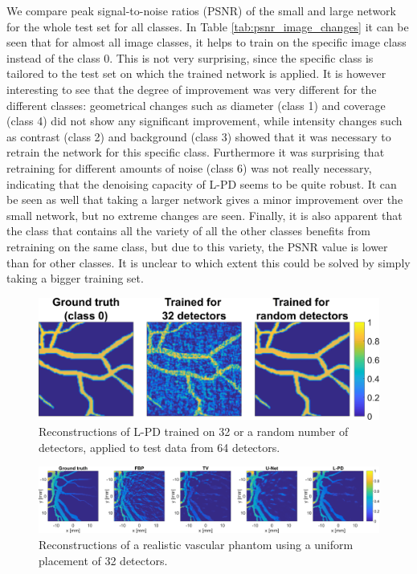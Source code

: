 \documentclass[journal]{IEEEtran}
\begin{document}
We compare peak signal-to-noise ratios (PSNR) of the small and large network for the whole test set for all classes. In Table \ref{tab:psnr_image_changes} it can be seen that for almost all image classes, it helps to train on the specific image class instead of the class 0. This is not very surprising, since the specific class is tailored to the test set on which the trained network is applied. It is however interesting to see that the degree of improvement was very different for the different classes: geometrical changes such as diameter (class 1) and coverage (class 4) did not show any significant improvement, while intensity changes such as contrast (class 2) and background (class 3) showed that it was necessary to retrain the network for this specific class. Furthermore it was surprising that retraining for different amounts of noise (class 6) was not really necessary, indicating that the denoising capacity of L-PD seems to be quite robust. It can be seen as well that taking a larger network gives a minor improvement over the small network, but no extreme changes are seen. Finally, it is also apparent that the class that contains all the variety of all the other classes benefits from retraining on the same class, but due to this variety, the PSNR value is lower than for other classes. It is unclear to which extent this could be solved by simply taking a bigger training set. 

\begin{figure}[ht!]
\centering
\includegraphics[width=\linewidth]{images/system_changes_im.png}
\caption{Reconstructions of L-PD trained on 32 or a random number of detectors, applied to test data from 64 detectors.}
\label{fig:system_changes_result}
\end{figure}

\begin{figure}[ht!]
\centering
\includegraphics[width=\linewidth]{images/paper_synthetic_recon.png}
\caption{Reconstructions of a realistic vascular phantom using a uniform placement of 32 detectors.}
\label{fig:synth_recon}
\end{figure}
\end{document}
